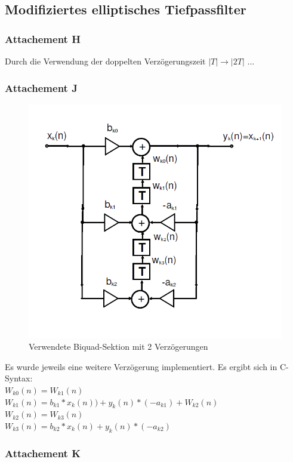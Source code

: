 \clearpage

\subsection{Modifiziertes elliptisches Tiefpassfilter}
\subsubsection{Attachement H}
\noindent Durch die Verwendung der doppelten Verzögerungszeit $|T| \rightarrow |2T|$ ...

\subsubsection{Attachement J}

\begin{figure}[h]
\centering
\includegraphics[width=0.7\linewidth]{Bilder/Biquad2T}
\caption{Verwendete Biquad-Sektion mit 2 Verzögerungen}
\label{fig:Biquad2T}
\end{figure}

\noindent Es wurde jeweils eine weitere Verzögerung implementiert. Es ergibt sich in C-Syntax:\\
$W_{k0}(n)=W_{k1}(n)$\\
$W_{k1}(n)=b_{k1}*x_k(n))+y_k(n)*(-a_{k1})+W_{k2}(n)$\\
$W_{k2}(n)=W_{k3}(n)$\\
$W_{k3}(n)=b_{k2}*x_k(n)+y_k(n)*(-a_{k2})$

\clearpage

\subsubsection{Attachement K}

